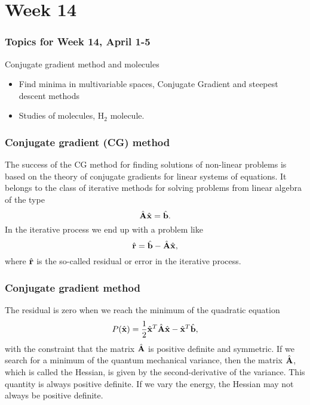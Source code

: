 \section[Week 14]{Week 14}
\frame
{
  \frametitle{Topics for Week 14, April 1-5}
  \begin{block}{Conjugate gradient method and molecules}
\begin{itemize}
\item Find minima in multivariable spaces, Conjugate Gradient and steepest descent methods
\item Studies of molecules, H$_2$ molecule.
\end{itemize}
  \end{block}
} 



\frame
{
  \frametitle{Conjugate gradient (CG) method}
\begin{small}
{\scriptsize
The success of the CG method  for finding solutions of non-linear problems is based
on the theory of conjugate gradients for linear systems of equations. It belongs
to the class of iterative methods for solving problems from linear algebra of the type
\[
  \hat{{\bf A}}\hat{\bf {x}} = \hat{\bf {b}}.
\]
In the iterative process we end up with a problem like
\[
  \hat{\bf {r}}= \hat{\bf {b}}-\hat{{\bf A}}\hat{\bf {x}},
\]
where $\hat{\bf {r}}$ is the so-called residual or error in the iterative process.
}
\end{small}
}


\frame
{
  \frametitle{Conjugate gradient method}
\begin{small}
{\scriptsize
The residual is zero when we reach the minimum of the quadratic equation
\[
  P(\hat{\bf {x}})=\frac{1}{2}\hat{\bf {x}}^T\hat{{\bf A}}\hat{\bf {x}} - \hat{\bf {x}}^T\hat{\bf {b}},
\]
with the constraint that the matrix $\hat{{\bf A}}$ is positive definite and symmetric.
If we search for a minimum of the quantum mechanical  variance, then the matrix 
$\hat{{\bf A}}$, which is called the Hessian, is given by the second-derivative of the variance.  This quantity is always positive definite. If we vary the energy, the Hessian may not always be positive definite. 
}
\end{small}
}





